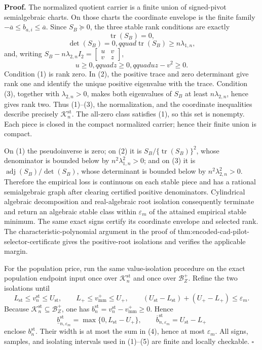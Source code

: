 \textbf{Proof.}
The normalized quotient carrier is a finite union of signed-pivot semialgebraic charts.  On those charts the coordinate envelope is the finite family \(-\overline a\le b_{a,i}\le\overline a\).  Since \(S_B\succeq0\), the three stable rank conditions are exactly
\[
\operatorname{tr}(S_B)=0,
\tag{1}
\]
\[
\det(S_B)=0,qquad \operatorname{tr}(S_B)\ge n\lambda_{1,n},
\tag{2}
\]
and, writing \(S_B-n\lambda_{2,n}I_2=\begin{bmatrix}u&v\\v&z\end{bmatrix}\),
\[
u\ge0,qquad z\ge0,qquad uz-v^2\ge0.
\tag{3}
\]
Condition (1) is rank zero.  In (2), the positive trace and zero determinant give rank one and identify the unique positive eigenvalue with the trace.  Condition (3), together with \(\lambda_{2,n}>0\), makes both eigenvalues of \(S_B\) at least \(n\lambda_{2,n}\), hence gives rank two.  Thus (1)--(3), the normalization, and the coordinate inequalities describe precisely \(\mathcal K_n^{\mathrm{st}}\).  The all-zero class satisfies (1), so this set is nonempty.  Each piece is closed in the compact normalized carrier; hence their finite union is compact.

On (1) the pseudoinverse is zero; on (2) it is \(S_B/\{\operatorname{tr}(S_B)\}^2\), whose denominator is bounded below by \(n^2\lambda_{1,n}^2>0\); and on (3) it is \(\operatorname{adj}(S_B)/\det(S_B)\), whose determinant is bounded below by \(n^2\lambda_{2,n}^2>0\).  Therefore the empirical loss is continuous on each stable piece and has a rational semialgebraic graph after clearing certified positive denominators.  Cylindrical algebraic decomposition and real-algebraic root isolation consequently terminate and return an algebraic stable class within \(\varepsilon_m\) of the attained empirical stable minimum.  The same exact signs certify its coordinate envelope and selected rank.  The characteristic-polynomial argument in the proof of thm:encoded-cad-pilot-selector-certificate gives the positive-root isolations and verifies the applicable margin.

For the population price, run the same value-isolation procedure on the exact population endpoint input once over \(\mathcal K_n^{\mathrm{st}}\) and once over \(\mathcal B_Z^+\).  Refine the two isolations until
\[
L_{\mathrm{st}}\le v_n^{\mathrm{st}}\le U_{\mathrm{st}},
\qquad
L_+\le v_{\mathrm{mm}}^+\le U_+,
\qquad
(U_{\mathrm{st}}-L_{\mathrm{st}})+(U_+-L_+)\le\varepsilon_m.
\tag{4}
\]
Because \(\mathcal K_n^{\mathrm{st}}\subseteq\mathcal B_Z^+\), one has \(b_n^{\mathrm{st}}=v_n^{\mathrm{st}}-v_{\mathrm{mm}}^+\ge0\).  Hence
\[
\underline b_{n,\varepsilon_m}^{\mathrm{st}}
=\max\{0,L_{\mathrm{st}}-U_+\},
\qquad
\overline b_{n,\varepsilon_m}^{\mathrm{st}}
=U_{\mathrm{st}}-L_+
\tag{5}
\]
enclose \(b_n^{\mathrm{st}}\).  Their width is at most the sum in (4), hence at most \(\varepsilon_m\).  All signs, samples, and isolating intervals used in (1)--(5) are finite and locally checkable. \(\square\)